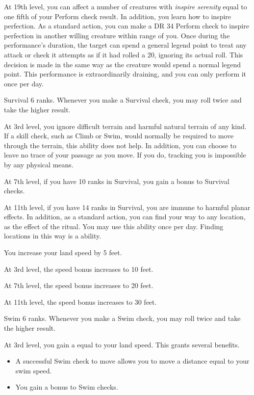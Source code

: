     At 19th level, you can affect a number of creatures with \textit{inspire serenity} equal to one fifth of your Perform check result.
    In addition, you learn how to inspire perfection.
     As a standard action, you can make a DR 34 Perform check to inspire perfection in another willing creature within \rngmed range of you.
    Once during the performance's duration, the target can spend a general legend point to treat any attack or check it attempts as if it had rolled a 20, ignoring its actual roll.
    This decision is made in the same way as the creature would spend a normal legend point.
    This performance is extraordinarily draining, and you can only perform it once per day.

    \featpre Survival 6 ranks.
    \featben Whenever you make a Survival check, you may roll twice and take the higher result.

    At 3rd level, you ignore difficult terrain and harmful natural terrain of any kind.
    If a skill check, such as Climb or Swim, would normally be required to move through the terrain, this ability does not help.
    In addition, you can choose to leave no trace of your passage as you move.
    If you do, tracking you is impossible by any physical means.

    At 7th level, if you have 10 ranks in Survival, you gain a  bonus to Survival checks.

    At 11th level, if you have 14 ranks in Survival, you are immune to harmful planar effects.
    In addition, as a standard action, you can find your way to any location, as the effect of the  ritual.
    You may use this ability once per day.
    Finding locations in this way is a  ability.

    \featben You increase your land speed by 5 feet.

    At 3rd level, the speed bonus increases to 10 feet.

    At 7th level, the speed bonus increases to 20 feet.

    At 11th level, the speed bonus increases to 30 feet.

    \featpre Swim 6 ranks.
    \featben Whenever you make a Swim check, you may roll twice and take the higher result.

    At 3rd level, you gain a  equal to your land speed.
    This grants several benefits.
    \begin{itemize}
        \item A successful Swim check to move allows you to move a distance equal to your swim speed.
        \item You gain a  bonus to Swim checks.
    \end{itemize}

